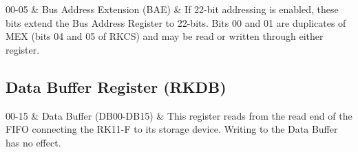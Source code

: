 \begin{bittable}
  00-05 & Bus Address Extension (BAE) & If 22-bit addressing is
  enabled, these bits extend the Bus Address Register to 22-bits.
  Bits 00 and 01 are duplicates of MEX (bits 04 and 05 of RKCS) and
  may be read or written through either register. \\
\end{bittable}


\subsection{Data Buffer Register (RKDB)}

\begin{register16}
\end{register16}

\begin{bittable}
  00-15 & Data Buffer (DB00-DB15) & This register reads from the read
  end of the FIFO connecting the RK11-F to its storage device.
  Writing to the Data Buffer has no effect. \\
\end{bittable}


